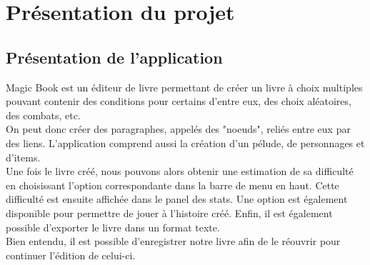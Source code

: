 \chapter{Présentation du projet}

	\section{Présentation de l'application}
        Magic Book est un éditeur de livre permettant de créer un livre à choix multiples pouvant contenir des conditions pour certains d'entre eux, des choix aléatoires, des combats, etc.\\
        On peut donc créer des paragraphes, appelés des "noeuds", reliés entre eux par des liens. L'application comprend aussi la création d'un pélude, de personnages et d'items.\\
        Une fois le livre créé, nous pouvons alors obtenir une estimation de sa difficulté en choisissant l'option correspondante dans la barre de menu en haut. Cette difficulté est ensuite affichée dans le panel des stats. Une option est également disponible pour permettre de jouer à l'histoire créé. Enfin, il est également possible d'exporter le livre dans un format texte.\\
        Bien entendu, il est possible d'enregistrer notre livre afin de le réouvrir pour continuer l'édition de celui-ci.
